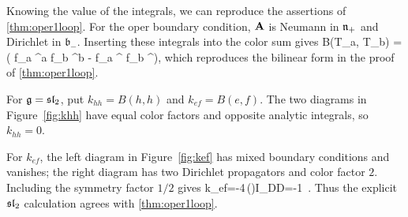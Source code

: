 \documentclass[11pt]{amsart}
\numberwithin{equation}{section}
\numberwithin{figure}{section}
\numberwithin{table}{section}
\begin{document}
\medskip 
Knowing the value of the integrals, we can reproduce the assertions of \cref{thm:oper1loop}.
For the oper boundary condition, $\mathbf{A}$ is Neumann in $\mathfrak{n}_+$ and Dirichlet in $\mathfrak b_-$.
Inserting these integrals into the color sum gives
\be
	\frac{\ii \hbar}{4\pi}B(T_a, T_b) = \left( f_{a }^{\ol a} f_{b }^{\ol b} -  f_{a \beta}^{\alpha} f_{b \alpha}^{\beta}\right),
\ee 
which reproduces the bilinear form in the proof of  \cref{thm:oper1loop}.

For $\mathfrak{g}=\mathfrak{sl}_2$, put $k_{hh}=B(h,h)$ and $k_{ef}=B(e,f)$.
The two diagrams in Figure~\ref{fig:khh} have equal color factors and opposite analytic integrals, so $k_{hh}=0$.


For $k_{ef}$, the left diagram in Figure~\ref{fig:kef} has mixed boundary conditions and vanishes; the right diagram has two Dirichlet propagators and color factor $2$.
Including the symmetry factor $1/2$ gives
\be
 k_{ef}=-4\pi\ii\,\big(\big)I_{DD}=-1~.
\ee
Thus the explicit $\mathfrak{sl}_2$ calculation agrees with  \cref{thm:oper1loop}.


\clearpage


	
\end{document}
